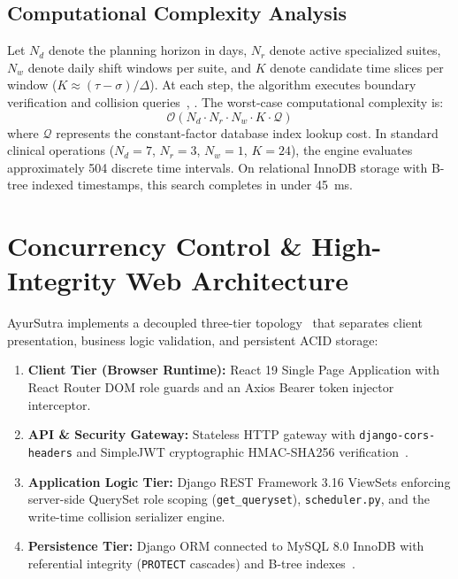\documentclass[conference]{IEEEtran}
\begin{document}
\subsection{Computational Complexity Analysis}
Let $N_d$ denote the planning horizon in days, $N_r$ denote active specialized suites, $N_w$ denote daily shift windows per suite, and $K$ denote candidate time slices per window ($K \approx (\tau - \sigma) / \Delta$). At each step, the algorithm executes boundary verification and collision queries~\cite{cayirli2003outpatient}, \cite{allen1983maintaining}. The worst-case computational complexity is:
\begin{equation}
\mathcal{O}\left( N_d \cdot N_r \cdot N_w \cdot K \cdot \mathcal{Q} \right)
\end{equation}
where $\mathcal{Q}$ represents the constant-factor database index lookup cost. In standard clinical operations ($N_d = 7$, $N_r = 3$, $N_w = 1$, $K = 24$), the engine evaluates approximately 504 discrete time intervals. On relational InnoDB storage with B-tree indexed timestamps, this search completes in under 45~ms.

\section{Concurrency Control \& High-Integrity Web Architecture}

AyurSutra implements a decoupled three-tier topology~\cite{fielding2000architectural} that separates client presentation, business logic validation, and persistent ACID storage:
\begin{enumerate}
    \item \textbf{Client Tier (Browser Runtime):} React 19 Single Page Application with React Router DOM role guards and an Axios Bearer token injector interceptor.
    \item \textbf{API \& Security Gateway:} Stateless HTTP gateway with \texttt{django-cors-headers} and SimpleJWT cryptographic HMAC-SHA256 verification~\cite{fielding2000architectural}.
    \item \textbf{Application Logic Tier:} Django REST Framework 3.16 ViewSets enforcing server-side QuerySet role scoping (\texttt{get\_queryset}), \texttt{scheduler.py}, and the write-time collision serializer engine.
    \item \textbf{Persistence Tier:} Django ORM connected to MySQL 8.0 InnoDB with referential integrity (\texttt{PROTECT} cascades) and B-tree indexes~\cite{panda2022concurrency}.
\end{enumerate}
\end{document}
